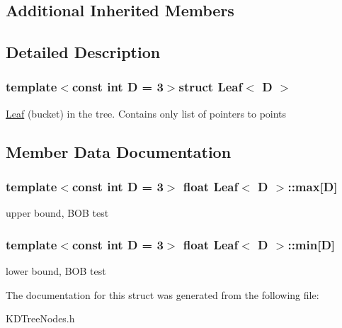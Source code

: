 \subsection*{Additional Inherited Members}


\subsection{Detailed Description}
\subsubsection*{template$<$const int D = 3$>$struct Leaf$<$ D $>$}

\hyperlink{structLeaf}{Leaf} (bucket) in the tree. Contains only list of pointers to points 

\subsection{Member Data Documentation}
\hypertarget{structLeaf_a2faeb5ae03f072a79ccb41583f736e0c}{
\subsubsection[{max}]{\setlength{\rightskip}{0pt plus 5cm}template$<$const int D = 3$>$ float {\bf Leaf}$<$ D $>$\-::max\mbox{[}D\mbox{]}}}\label{structLeaf_a2faeb5ae03f072a79ccb41583f736e0c}
upper bound, B\-O\-B test \hypertarget{structLeaf_a2f9a72a5b65b46055f9cddfe01a9fd7b}{
\subsubsection[{min}]{\setlength{\rightskip}{0pt plus 5cm}template$<$const int D = 3$>$ float {\bf Leaf}$<$ D $>$\-::min\mbox{[}D\mbox{]}}}\label{structLeaf_a2f9a72a5b65b46055f9cddfe01a9fd7b}
lower bound, B\-O\-B test 

The documentation for this struct was generated from the following file\-:\begin{DoxyCompactItemize}
\item 
K\-D\-Tree\-Nodes.\-h\end{DoxyCompactItemize}

